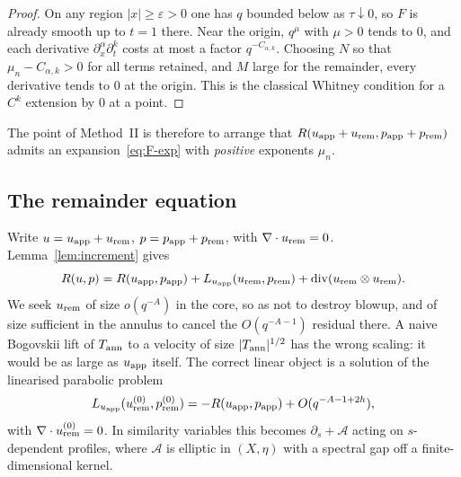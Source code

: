 \begin{proof}
On any region $|x|\ge\varepsilon>0$ one has $q$ bounded below as $\tau\downarrow 0$, so $F$ is already smooth up to $t=1$ there. Near the origin, $q^{\mu}$ with $\mu>0$ tends to $0$, and each derivative $\partial_x^\alpha\partial_t^k$ costs at most a factor $q^{-C_{\alpha,k}}$. Choosing $N$ so that $\mu_n-C_{\alpha,k}>0$ for all terms retained, and $M$ large for the remainder, every derivative tends to $0$ at the origin. This is the classical {W}hitney condition for a $C^k$ extension by $0$ at a point.
\end{proof}

The point of Method~II is therefore to arrange that $R(u_{\mathrm{app}}+u_{\mathrm{rem}},p_{\mathrm{app}}+p_{\mathrm{rem}})$ admits an expansion~\eqref{eq:F-exp} with \emph{positive} exponents $\mu_n$.

\subsection{The remainder equation}

Write $u=u_{\mathrm{app}}+u_{\mathrm{rem}}$, $p=p_{\mathrm{app}}+p_{\mathrm{rem}}$, with $\nabla\cdot u_{\mathrm{rem}}=0$. Lemma~\ref{lem:increment} gives
\begin{equation}
\label{eq:rem-eq}
R(u,p)
=R(u_{\mathrm{app}},p_{\mathrm{app}})
+L_{u_{\mathrm{app}}}(u_{\mathrm{rem}},p_{\mathrm{rem}})
+\operatorname{div}(u_{\mathrm{rem}}\otimes u_{\mathrm{rem}}).
\end{equation}
We seek $u_{\mathrm{rem}}$ of size $o(q^{-A})$ in the core, so as not to destroy blowup, and of size sufficient in the annulus to cancel the $O(q^{-A-1})$ residual there. A naive {B}ogovskii lift of $T_{\mathrm{ann}}$ to a velocity of size $|T_{\mathrm{ann}}|^{1/2}$ has the wrong scaling: it would be as large as $u_{\mathrm{app}}$ itself. The correct linear object is a solution of the linearised parabolic problem
\[
L_{u_{\mathrm{app}}}(u_{\mathrm{rem}}^{(0)},p_{\mathrm{rem}}^{(0)})
=-R(u_{\mathrm{app}},p_{\mathrm{app}})+O(q^{-A-1+2h}),
\]
with $\nabla\cdot u_{\mathrm{rem}}^{(0)}=0$. In similarity variables this becomes $\partial_s+\mathcal A$ acting on $s$-dependent profiles, where $\mathcal A$ is elliptic in $(X,\eta)$ with a spectral gap off a finite-dimensional kernel.

